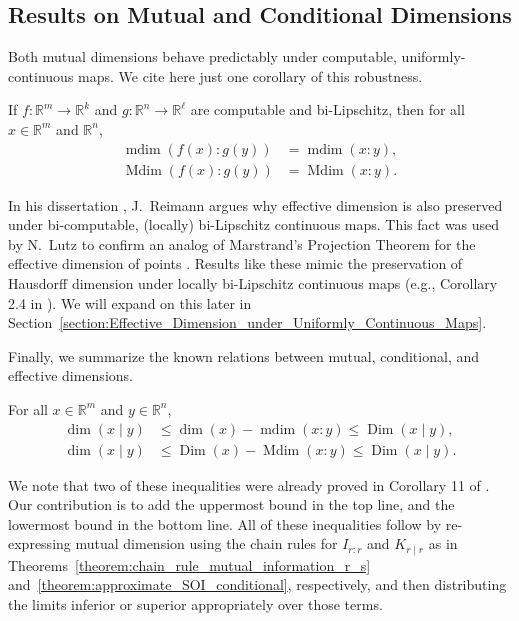 \subsection{Results on Mutual and Conditional Dimensions}

Both mutual dimensions behave predictably under computable, uniformly-continuous maps. We cite here just one corollary of this robustness. 

\begin{theorem}
    \label{theorem:mutual_dimension_invariant_under_computable_bi_Lipshictz}
    If $f : \mathbb{R}^m \to \mathbb{R}^k$ and $g : \mathbb{R}^n \to \mathbb{R}^\ell$ are computable and bi-Lipschitz, then for all $x \in \mathbb{R}^m$ and $\mathbb{R}^n$,
    \begin{align*}
        \operatorname{mdim}(f(x) : g(y)) &= \operatorname{mdim}(x : y),\\
        \operatorname{Mdim}(f(x) : g(y)) &= \operatorname{Mdim}(x : y).
    \end{align*}
\end{theorem}

In his dissertation \cite{Rei04}, J.~Reimann argues why effective dimension is also preserved under bi-computable, (locally) bi-Lipschitz continuous maps. This fact was used by N.~Lutz to confirm an analog of Marstrand's Projection Theorem for the effective dimension of points \cite{Lut17}. Results like these mimic the preservation of Hausdorff dimension under locally bi-Lipschitz continuous maps (e.g., Corollary 2.4 in \cite{Fal90}). We will expand on this later in Section~\ref{section:Effective_Dimension_under_Uniformly_Continuous_Maps}.

Finally, we summarize the known relations between mutual, conditional, and effective dimensions. 

\begin{proposition}
    \label{proposition:relating_mutual_dimension_and_conditional_dimension}
    For all $x \in \mathbb{R}^m$ and $y \in \mathbb{R}^n$,
    \begin{align*}
        \dim(x \mid y) & \leq \operatorname{dim}(x) - \operatorname{mdim}(x : y) \leq \operatorname{Dim}(x \mid y),\\
        \dim(x \mid y) & \leq \operatorname{Dim}(x) - \operatorname{Mdim}(x : y) \leq \operatorname{Dim}(x \mid y).
    \end{align*}
\end{proposition}
We note that two of these inequalities were already proved in Corollary 11 of \cite{LL18}. Our contribution is to add the uppermost bound in the top line, and the lowermost bound in the bottom line. All of these inequalities follow by re-expressing mutual dimension using the chain rules for $I_{r : r}$ and $K_{r \mid r}$ as in Theorems~\ref{theorem:chain_rule_mutual_information_r_s} and~\ref{theorem:approximate_SOI_conditional}, respectively, and then distributing the limits inferior or superior appropriately over those terms. 

